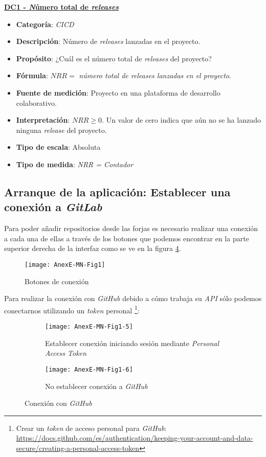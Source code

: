 \textbf{\underline{DC1 - \textit Número total de \textit{releases}}}
\begin{itemize}
	\item \textbf{Categoría}: \textit{CICD}
	\item \textbf{Descripción}: Número de \textit{releases} lanzadas en el proyecto.
	\item \textbf{Propósito}: ¿Cuál es el número total de \textit{releases} del  proyecto?
	\item \textbf{Fórmula}: $NRR =$ \textit{número total de releases lanzadas en el proyecto}.
	\item \textbf{Fuente de medición}: Proyecto en una plataforma de desarrollo colaborativo.
	\item \textbf{Interpretación}: $NRR \geq 0$. Un valor de cero indica que aún no se ha lanzado ninguna \textit{release} del proyecto.
	\item \textbf{Tipo de escala}: Absoluta
	\item \textbf{Tipo de medida}: \textit{NRR = Contador}
\end{itemize}

\subsection{Arranque de la aplicación: Establecer una conexión a \textit{GitLab}}
Para poder añadir repositorios desde las forjas es necesario realizar una conexión a cada una de ellas a través de los botones que podemos encontrar en la parte superior derecha de la interfaz como se ve en la figura \ref{fig:AnexE-MN-Fig1}.

\begin{figure}[!h]
	\centering
	\texttt{[image: AnexE-MN-Fig1]}
	\caption{Botones de conexión}\label{fig:AnexE-MN-Fig1}
\end{figure}
\FloatBarrier

Para realizar la conexión con \textit{GitHub} debido a cómo trabaja su \textit{API} sólo podemos conectarnos utilizando un \textit{token} personal \footnote{Crear un \textit{token} de acceso personal para \textit{GitHub}: \url{https://docs.github.com/es/authentication/keeping-your-account-and-data-secure/creating-a-personal-access-token}}:
\begin{figure}[!h]
	\centering
	\begin{subfigure}{.45\textwidth}
		\centering
		\texttt{[image: AnexE-MN-Fig1-5]}
		\caption{Establecer conexión iniciando sesión mediante \textit{Personal Access Token}}
		\label{fig:dialogo-conexion_contraseña}
	\end{subfigure}\hfill
	\begin{subfigure}{.45\textwidth}
		\centering
		\texttt{[image: AnexE-MN-Fig1-6]}
		\caption{No establecer conexión a \textit{GitHub}}
		\label{fig:dialogo-conexion_token}
	\end{subfigure}
	\caption{Conexión con \textit{GitHub}}
	\label{fig:AnexE-MN-Fig1}
\end{figure}


